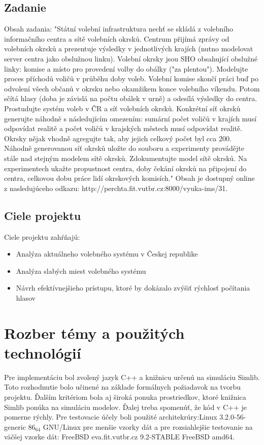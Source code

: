 \documentclass[12pt,a4paper,titlepage,final]{article}
\begin{document}
\subsection{Zadanie}
Obsah zadania: "Státní volební infrastruktura nechť se skládá z volebního informačního centra a sítě volebních okrsků. Centrum přijímá zprávy od volebních okrsků a prezentuje výsledky v jednotlivých krajích (nutno modelovat server centra jako obslužnou linku). Volební okrsky jsou SHO obsahující obslužné linky: komise a místo pro provedení volby do obálky ("za plentou"). Modelujte proces příchodů voličů v průběhu doby voleb. Volební komise skončí práci buď po odvolení všech občanů v okrsku nebo okamžikem konce volebního víkendu. Potom sčítá hlasy (doba je závislá na počtu obálek v urně) a odesílá výsledky do centra. Prostudujte systém voleb v ČR a síť volebních okrsků. Konkrétní síť okrsků generujte náhodně s následujícím omezením: sumární počet voličů v krajích musí odpovídat realitě a počet voličů v krajských městech musí odpovídat realitě. Okrsky nějak vhodně agregujte tak, aby jejich celkový počet byl cca 200. Náhodně generovanou síť okrsků uložte do souboru a experimenty provádějte stále nad stejným modelem sítě okrsků. Zdokumentujte model sítě okrsků. Na experimentech ukažte propustnost centra, doby čekání okrsků na připojení do centra, celkovou dobu práce lidí okrskových komisích."
Obsah je dostupný online z nasledujúceho odkazu: http://perchta.fit.vutbr.cz:8000/vyuka-ims/31.\cite{Prokop:Algoritmy}



\subsection{Ciele projektu}
Ciele projektu zahŕňajú:
\begin{itemize}
\item Analýza aktuálneho volebného systému v Českej republike
\item Analýza slabých miest volebného systému
\item Návrh efektívnejšieho prístupu, ktoré by dokázalo zvýšiť rýchlosť počítania hlasov
\end{itemize}


\section{Rozber témy a použitých technológií}
Pre implementáciu bol zvolený jazyk C++ a knižnicu určenú na simuláciu Simlib. Toto rozhodnutie bolo učinené na základe formálnych požiadavok na tvorbu projektu. Ďalším kritériom bola aj široká ponuka prostriedkov, ktoré knižnica Simlib ponúka na simuláciu modelov. Ďalej treba spomenúť, že kód v C++ je pomerne rýchly.
\indent
Pre testovacie účely boli použité architekrúry:Linux 3.2.0-56-generic $86_64$ GNU/Linux pre menšie vzorky dát a pre rozsiahlejšie testovanie na väčšej vzorke dát: FreeBSD eva.fit.vutbr.cz 9.2-STABLE FreeBSD amd64.
\end{document}
